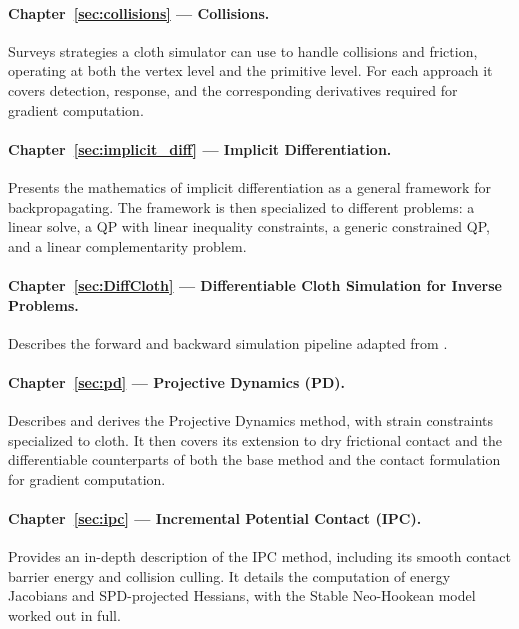 \documentclass{article}
\begin{document}
\paragraph{Chapter~\ref{sec:collisions} — Collisions.}
Surveys strategies a cloth simulator can use to handle collisions and friction, operating at both the vertex level and the primitive level. For each approach it covers detection, response, and the corresponding derivatives required for gradient computation.

\paragraph{Chapter~\ref{sec:implicit_diff} — Implicit Differentiation.}
Presents the mathematics of implicit differentiation as a general framework for backpropagating. The framework is then specialized to different problems: a linear solve, a QP with linear inequality constraints, a generic constrained QP, and a linear complementarity problem.

\paragraph{Chapter~\ref{sec:DiffCloth} — Differentiable Cloth Simulation for Inverse Problems.}
Describes the forward and backward simulation pipeline adapted from \cite{liang2019differentiable}.

\paragraph{Chapter~\ref{sec:pd} — Projective Dynamics (PD).}
Describes and derives the Projective Dynamics method, with strain constraints specialized to cloth. It then covers its extension to dry frictional contact and the differentiable counterparts of both the base method and the contact formulation for gradient computation.

\paragraph{Chapter~\ref{sec:ipc} — Incremental Potential Contact (IPC).}
Provides an in-depth description of the IPC method, including its smooth contact barrier energy and collision culling. It details the computation of energy Jacobians and SPD-projected Hessians, with the Stable Neo-Hookean model worked out in full.

\newpage
\end{document}
